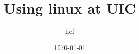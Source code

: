 \documentclass{beamer}
\title{Using linux at UIC}
\author{hef}
\date{\today}
\begin{document}
\frame{\titlepage}
\section[outline]{}
\frame{\tableofcontents}
\end{document}
